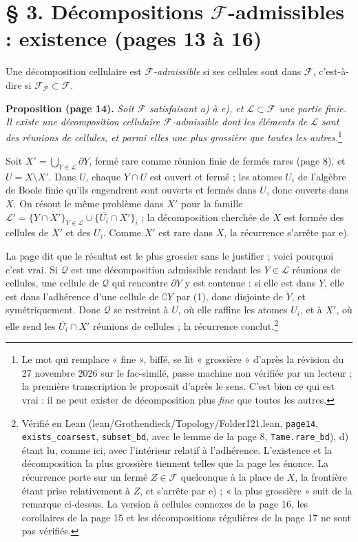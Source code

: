 \documentclass[11pt,a4paper]{article}
\begin{document}
\section*{§ 3. Décompositions $\mathcal{F}$-admissibles : existence (pages 13 à 16)}

Une décomposition cellulaire est \emph{$\mathcal{F}$-admissible} si ses cellules
sont dans $\mathcal{F}$, c'est-à-dire si $\mathcal{F}_{\mathcal{P}} \subset
\mathcal{F}$.

\textbf{Proposition (page 14).} \emph{Soit $\mathcal{F}$ satisfaisant a) à e), et
$\mathcal{L} \subset \mathcal{F}$ une partie finie. Il existe une décomposition
cellulaire $\mathcal{F}$-admissible dont les éléments de $\mathcal{L}$ sont des
réunions de cellules, et parmi elles une plus grossière que toutes les
autres.}\footnote{Le mot qui remplace « fine », biffé, se lit « grossière »
d'après la révision du 27 novembre 2026 sur le fac-similé, passe machine non
vérifiée par un lecteur ; la première transcription le proposait d'après le
sens. C'est bien ce qui est vrai : il ne peut exister de décomposition plus \emph{fine} que toutes les
autres.}

Soit $X' = \bigcup_{Y \in \mathcal{L}} \partial Y$, fermé rare comme réunion
finie de fermés rares (page 8), et $U = X \setminus X'$. Dans $U$, chaque
$Y \cap U$ est ouvert et fermé ; les atomes $U_i$ de l'algèbre de Boole finie
qu'ils engendrent sont ouverts et fermés dans $U$, donc ouverts dans $X$. On
résout le même problème dans $X'$ pour la famille
$\mathcal{L}' = \{ Y \cap X' \}_{Y \in \mathcal{L}} \cup \{ \overline{U_i} \cap
X' \}_i$ ; la décomposition cherchée de $X$ est formée des cellules de $X'$ et
des $U_i$. Comme $X'$ est rare dans $X$, la récurrence s'arrête par e).

La page dit que le résultat est le plus grossier sans le justifier ; voici
pourquoi c'est vrai. Si $\mathcal{Q}$ est une décomposition admissible rendant
les $Y \in \mathcal{L}$ réunions de cellules, une cellule de $\mathcal{Q}$ qui
rencontre $\partial Y$ y est contenue : si elle est dans $Y$, elle est dans
l'adhérence d'une cellule de $\complement Y$ par (1), donc disjointe de
$\mathring{Y}$, et symétriquement. Donc $\mathcal{Q}$ se restreint à $U$, où
elle raffine les atomes $U_i$, et à $X'$, où elle rend les $\overline{U_i} \cap
X'$ réunions de cellules ; la récurrence conclut.\footnote{Vérifié en Lean
(lean/Grothendieck/Topology/Folder121.lean, \texttt{page14},
\texttt{exists\_coarsest}, \texttt{subset\_bd}, avec le lemme de la page 8,
\texttt{Tame.rare\_bd}), d) étant lu, comme ici, avec l'intérieur relatif à
l'adhérence. L'existence et la décomposition la plus grossière tiennent telles
que la page les énonce. La récurrence porte sur un fermé $Z \in \mathcal{F}$
quelconque à la place de $X$, la frontière étant prise relativement à $Z$, et
s'arrête par e) ; « la plus grossière » suit de la remarque ci-dessus. La
version à cellules connexes de la page 16, les corollaires de la page 15 et les
décompositions régulières de la page 17 ne sont pas vérifiés.}
\end{document}
